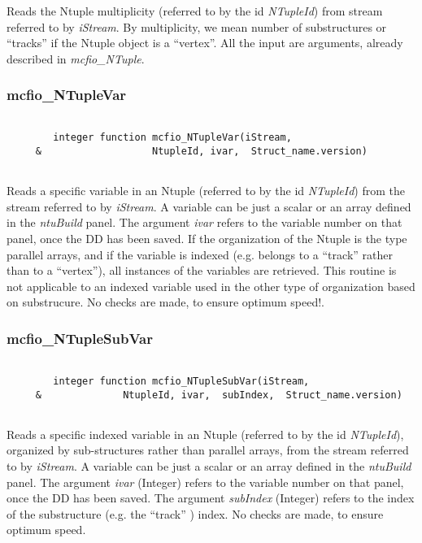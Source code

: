 	Reads the Ntuple multiplicity (referred to by the id {\em NTupleId}) 
from stream referred to by {\em iStream}.  By multiplicity, we mean number of 
substructures or ``tracks'' if the Ntuple object is a ``vertex''.  All 
the input are arguments, already described in {\em mcfio\_NTuple}. 

 
\subsubsection{mcfio\_NTupleVar}

\begin{verbatim}

        integer function mcfio_NTupleVar(iStream,
     &                   NtupleId, ivar,  Struct_name.version)
     
\end{verbatim}

Reads a specific variable in an Ntuple (referred to by the id {\em NTupleId})  from
the stream referred to by {\em iStream}.   A variable can be just a scalar or an array
defined in the {\em ntuBuild} panel. The argument {\em ivar} refers to the 
variable number on that panel, once the DD has been saved. If the organization
of the Ntuple  is the type parallel arrays, and if the variable is indexed
(e.g. belongs to  a ``track'' rather than to a ``vertex''), all instances of the
variables are  retrieved.  This routine is not applicable to an indexed
variable used in  the other type of organization based on substrucure. 
No checks are made, to ensure optimum speed!.  

\subsubsection{mcfio\_NTupleSubVar}

\begin{verbatim}

        integer function mcfio_NTupleSubVar(iStream,
     &              NtupleId, ivar,  subIndex,  Struct_name.version)
     
\end{verbatim}

Reads a specific indexed variable in an Ntuple (referred to by the id {\em
NTupleId}), organized by sub-structures rather than parallel arrays, from the
stream referred to by {\em iStream}.   A variable can be just a scalar or an array
defined in the {\em ntuBuild} panel. The argument {\em ivar} (Integer) refers
to the  variable number on that panel, once the DD has been saved. The
argument  {\em subIndex}  (Integer) refers to the index of the substructure
(e.g. the ``track'' ) index. 
No checks are made, to ensure optimum speed.  

